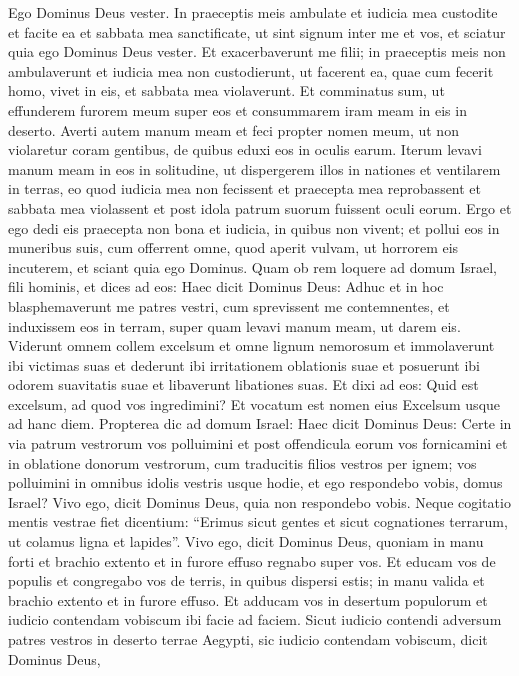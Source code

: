\begin{biblechapter}
\verse Ego Dominus Deus vester. In praeceptis meis ambulate et iudicia mea custodite et facite ea 
\verse et sabbata mea sanctificate, ut sint signum inter me et vos, et sciatur quia ego Dominus Deus vester. 
\verse Et exacerbaverunt me filii; in praeceptis meis non ambulaverunt et iudicia mea non custodierunt, ut facerent ea, quae cum fecerit homo, vivet in eis, et sabbata mea violaverunt. Et comminatus sum, ut effunderem furorem meum super eos et consummarem iram meam in eis in deserto. 
\verse Averti autem manum meam et feci propter nomen meum, ut non violaretur coram gentibus, de quibus eduxi eos in oculis earum. 
\verse Iterum levavi manum meam in eos in solitudine, ut dispergerem illos in nationes et ventilarem in terras, 
\verse eo quod iudicia mea non fecissent et praecepta mea reprobassent et sabbata mea violassent et post idola patrum suorum fuissent oculi eorum. 
\verse Ergo et ego dedi eis praecepta non bona et iudicia, in quibus non vivent; 
\verse et pollui eos in muneribus suis, cum offerrent omne, quod aperit vulvam, ut horrorem eis incuterem, et sciant quia ego Dominus. 
\verse Quam ob rem loquere ad domum Israel, fili hominis, et dices ad eos: Haec dicit Dominus Deus: Adhuc et in hoc blasphemaverunt me patres vestri, cum sprevissent me contemnentes, 
\verse et induxissem eos in terram, super quam levavi manum meam, ut darem eis. Viderunt omnem collem excelsum et omne lignum nemorosum et immolaverunt ibi victimas suas et dederunt ibi irritationem oblationis suae et posuerunt ibi odorem suavitatis suae et libaverunt libationes suas. 
\verse Et dixi ad eos: Quid est excelsum, ad quod vos ingredimini? Et vocatum est nomen eius Excelsum usque ad hanc diem. 
\verse Propterea dic ad domum Israel: Haec dicit Dominus Deus: Certe in via patrum vestrorum vos polluimini et post offendicula eorum vos fornicamini 
\verse et in oblatione donorum vestrorum, cum traducitis filios vestros per ignem; vos polluimini in omnibus idolis vestris usque hodie, et ego respondebo vobis, domus Israel? Vivo ego, dicit Dominus Deus, quia non respondebo vobis. 
\verse Neque cogitatio mentis vestrae fiet dicentium: “Erimus sicut gentes et sicut cognationes terrarum, ut colamus ligna et lapides”. 
\verse Vivo ego, dicit Dominus Deus, quoniam in manu forti et brachio extento et in furore effuso regnabo super vos. 
\verse Et educam vos de populis et congregabo vos de terris, in quibus dispersi estis; in manu valida et brachio extento et in furore effuso. 
\verse Et adducam vos in desertum populorum et iudicio contendam vobiscum ibi facie ad faciem. 
\verse Sicut iudicio contendi adversum patres vestros in deserto terrae Aegypti, sic iudicio contendam vobiscum, dicit Dominus Deus, 

\end{biblechapter}
